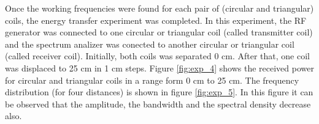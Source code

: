 \documentclass[a4paper,10pt]{article}
\begin{document}
Once the working frequencies were found for each pair of (circular and triangular) coils, the energy transfer experiment was completed. In this experiment, the RF generator was connected to one circular or triangular coil (called transmitter coil) and the spectrum analizer was conected to another circular or triangular coil (called receiver coil). Initially, both coils was separated 0 cm. After that, one coil was displaced to 25 cm in 1 cm steps. Figure \ref{fig:exp_4} shows the received power for circular and triangular coils in a range form 0 cm to 25 cm. The frequency distribution (for four distances) is shown in figure \ref{fig:exp_5}. In this figure it can be observed that the amplitude, the bandwidth and the spectral density decrease also.

\begin{figure}[tbp]
\begin{center}
\end{center}
\end{figure}
\end{document}
